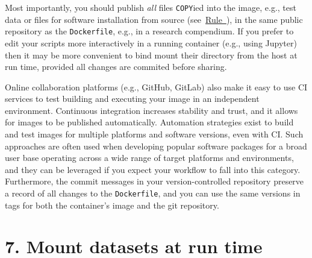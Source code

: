 \documentclass[10pt,letterpaper]{article}
\begin{document}
Most importantly, you should publish \emph{all} files \texttt{COPY}ied
into the image, e.g., test data or files for software installation from
source (see~\hyperref[{rule:mount}]{Rule~}), in
the same public repository as the \texttt{Dockerfile}, e.g., in a
research compendium. If you prefer to edit your scripts more
interactively in a running container (e.g., using Jupyter) then it may
be more convenient to bind mount their directory from the host at run
time, provided all changes are commited before sharing.

Online collaboration platforms (e.g., GitHub, GitLab) also make it easy
to use CI services to test building and executing your image in an
independent environment. Continuous integration increases stability and
trust, and it allows for images to be published automatically.
Automation strategies exist to build and test images for multiple
platforms and software versions, even with CI. Such approaches are often
used when developing popular software packages for a broad user base
operating across a wide range of target platforms and environments, and
they can be leveraged if you expect your workflow to fall into this
category. Furthermore, the commit messages in your version-controlled
repository preserve a record of all changes to the \texttt{Dockerfile},
and you can use the same versions in tags for both the container's image
and the git repository.

\hypertarget{mount-datasets-at-run-time}{%
\section*{7. Mount datasets at run
time}\label{mount-datasets-at-run-time}}

  \label{rule:mount} 
\end{document}
